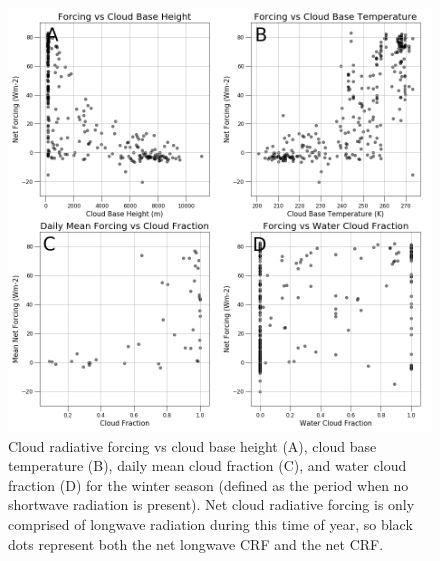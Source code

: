 \begin{figure}[H]
    \centering
    \includegraphics[width=1\linewidth]{figures/chapter4/ch2_f8.png}
    \caption[Cloud radiative forcing vs cloud base height, cloud base temperature, cloud fraction, and water cloud fraction]{Cloud radiative forcing vs cloud base height (A), cloud base temperature (B), daily mean cloud fraction (C), and water cloud fraction (D) for the winter season (defined as the period when no shortwave radiation is present). Net cloud radiative forcing is only comprised of longwave radiation during this time of year, so black dots represent both the net longwave CRF and the net CRF.}
    \label{fig:winter:crf}
\end{figure}

